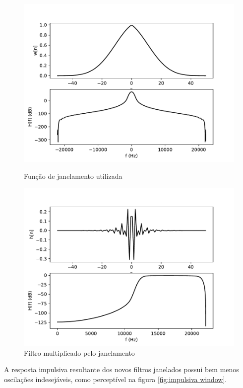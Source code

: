\begin{figure}[H]
        \includegraphics[scale=0.5]{fig/window.pdf}
        \caption{Função de janelamento utilizada}
        \label{fig:window}
    \endminipage
        \includegraphics[scale=0.5]{fig/windowfilter9.pdf}
        \caption{Filtro multiplicado pelo janelamento}
        \label{fig:fwindow}
    \endminipage
\end{figure}

A resposta impulsiva resultante dos novos filtros janelados possui bem menos oscilações indesejáveis, como perceptível na figura \ref{fig:impulsiva window}.

